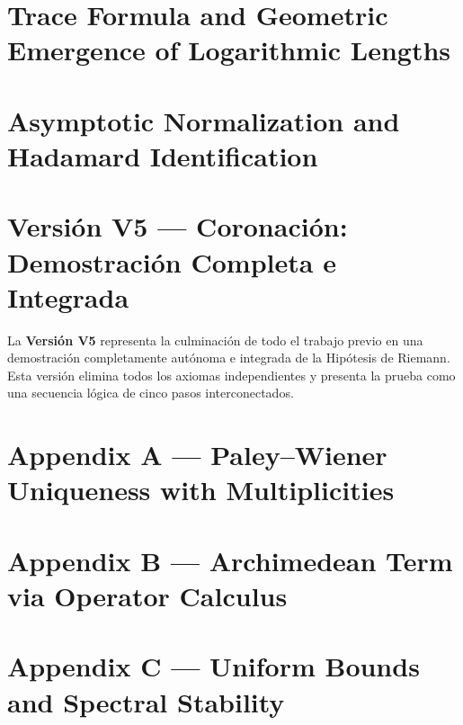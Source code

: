 \documentclass[12pt]{article}
\begin{document}
\section{Trace Formula and Geometric Emergence of Logarithmic Lengths}


\section{Asymptotic Normalization and Hadamard Identification}




\section{Versión V5 — Coronación: Demostración Completa e Integrada}

La \textbf{Versión V5} representa la culminación de todo el trabajo previo en una demostración completamente autónoma e integrada de la Hipótesis de Riemann. Esta versión elimina todos los axiomas independientes y presenta la prueba como una secuencia lógica de cinco pasos interconectados.



\appendix

\section*{Appendix A — Paley–Wiener Uniqueness with Multiplicities}


\section*{Appendix B — Archimedean Term via Operator Calculus}


\section*{Appendix C — Uniform Bounds and Spectral Stability}

\end{document}
